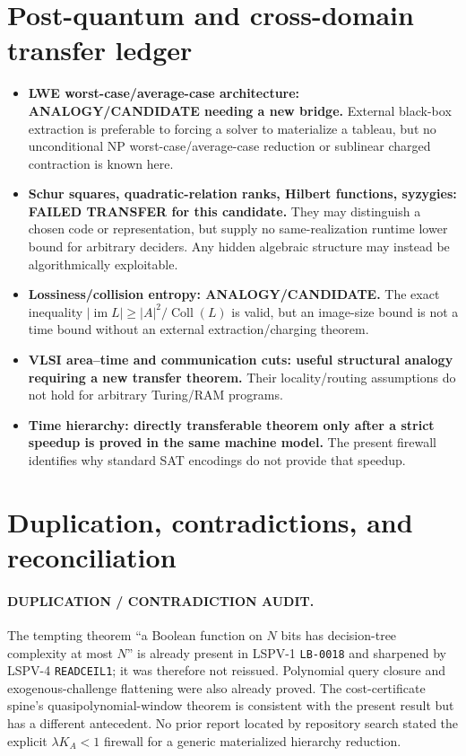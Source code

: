 \documentclass[11pt]{article}
\begin{document}
\section{Post-quantum and cross-domain transfer ledger}
\begin{itemize}[leftmargin=*]
\item \textbf{LWE worst-case/average-case architecture: ANALOGY/CANDIDATE needing a
new bridge.}  External black-box extraction is preferable to forcing a solver to
materialize a tableau, but no unconditional NP worst-case/average-case reduction or
sublinear charged contraction is known here.
\item \textbf{Schur squares, quadratic-relation ranks, Hilbert functions, syzygies:
FAILED TRANSFER for this candidate.}  They may distinguish a chosen code or
representation, but supply no same-realization runtime lower bound for arbitrary
deciders.  Any hidden algebraic structure may instead be algorithmically exploitable.
\item \textbf{Lossiness/collision entropy: ANALOGY/CANDIDATE.}  The exact inequality
$|\operatorname{im}L|\ge |A|^2/\operatorname{Coll}(L)$ is valid, but an image-size
bound is not a time bound without an external extraction/charging theorem.
\item \textbf{VLSI area--time and communication cuts: useful structural analogy
requiring a new transfer theorem.}  Their locality/routing assumptions do not hold
for arbitrary Turing/RAM programs.
\item \textbf{Time hierarchy: directly transferable theorem only after a strict
speedup is proved in the same machine model.}  The present firewall identifies why
standard SAT encodings do not provide that speedup.
\end{itemize}

\section{Duplication, contradictions, and reconciliation}
\paragraph{DUPLICATION / CONTRADICTION AUDIT.}
The tempting theorem ``a Boolean function on $N$ bits has decision-tree complexity
at most $N$'' is already present in LSPV-1 \texttt{LB-0018} and sharpened by
LSPV-4 \texttt{READCEIL1}; it was therefore not reissued.  Polynomial query closure
and exogenous-challenge flattening were also already proved.  The cost-certificate
spine's quasipolynomial-window theorem is consistent with the present result but has
a different antecedent.  No prior report located by repository search stated the
explicit $\lambda K_A<1$ firewall for a generic materialized hierarchy reduction.
\end{document}
